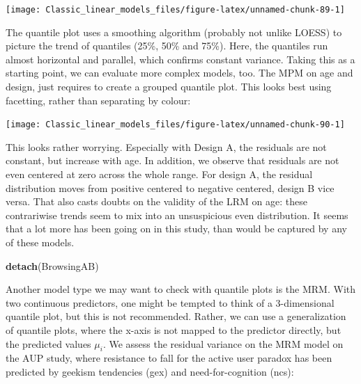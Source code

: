 \documentclass[]{svmono}
\newenvironment{Shaded}{\begin{snugshade}}{\end{snugshade}}
\newcommand{\KeywordTok}[1]{\textcolor[rgb]{0.13,0.29,0.53}{\textbf{#1}}}
\newcommand{\DataTypeTok}[1]{\textcolor[rgb]{0.13,0.29,0.53}{#1}}
\newcommand{\DecValTok}[1]{\textcolor[rgb]{0.00,0.00,0.81}{#1}}
\newcommand{\StringTok}[1]{\textcolor[rgb]{0.31,0.60,0.02}{#1}}
\newcommand{\OperatorTok}[1]{\textcolor[rgb]{0.81,0.36,0.00}{\textbf{#1}}}
\newcommand{\NormalTok}[1]{#1}
\begin{document}
\texttt{[image: Classic\_linear\_models\_files/figure-latex/unnamed-chunk-89-1]}

The quantile plot uses a smoothing algorithm (probably not unlike LOESS)
to picture the trend of quantiles (25\%, 50\% and 75\%). Here, the
quantiles run almost horizontal and parallel, which confirms constant
variance. Taking this as a starting point, we can evaluate more complex
models, too. The MPM on age and design, just requires to create a
grouped quantile plot. This looks best using facetting, rather than
separating by colour:

\begin{Shaded}
\end{Shaded}

\texttt{[image: Classic\_linear\_models\_files/figure-latex/unnamed-chunk-90-1]}

This looks rather worrying. Especially with Design A, the residuals are
not constant, but increase with age. In addition, we observe that
residuals are not even centered at zero across the whole range. For
design A, the residual distribution moves from positive centered to
negative centered, design B vice versa. That also casts doubts on the
validity of the LRM on age: these contrariwise trends seem to mix into
an unsuspicious even distribution. It seems that a lot more has been
going on in this study, than would be captured by any of these models.

\begin{Shaded}
\begin{Highlighting}[]
\KeywordTok{detach}\NormalTok{(BrowsingAB)}
\end{Highlighting}
\end{Shaded}

Another model type we may want to check with quantile plots is the MRM.
With two continuous predictors, one might be tempted to think of a
3-dimensional quantile plot, but this is not recommended. Rather, we can
use a generalization of quantile plots, where the x-axis is not mapped
to the predictor directly, but the predicted values \(\mu_i\). We assess
the residual variance on the MRM model on the AUP study, where
resistance to fall for the active user paradox has been predicted by
geekism tendencies (gex) and need-for-cognition (ncs):
\end{document}
